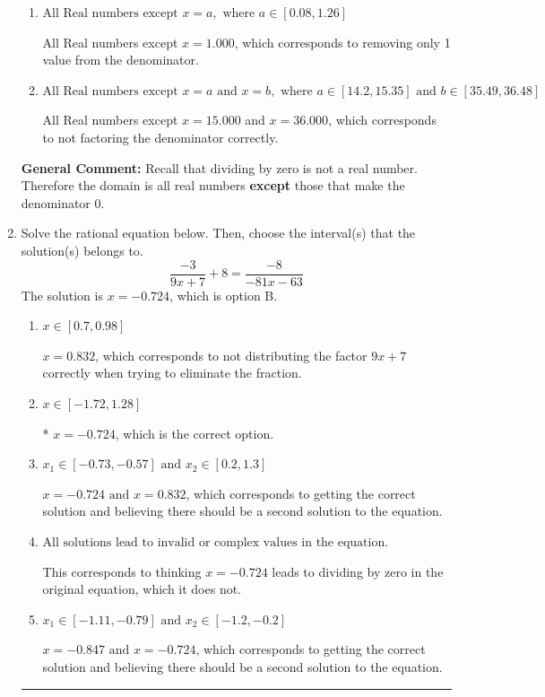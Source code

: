 \documentclass{extbook}[14pt]
\newcommand{\litem}[1]{\item #1

\rule{\textwidth}{0.4pt}}
\begin{document}
\begin{enumerate}
{\begin{enumerate}[label=\Alph*.]
All Real numbers except $x = 15.000$, which corresponds to removing a distractor value from the denominator.
\item \( \text{All Real numbers except } x = a, \text{ where } a \in [0.08, 1.26] \)

All Real numbers except $x = 1.000$, which corresponds to removing only 1 value from the denominator.
\item \( \text{All Real numbers except } x = a \text{ and } x = b, \text{ where } a \in [14.2, 15.35] \text{ and } b \in [35.49, 36.48] \)

All Real numbers except $x = 15.000$ and $x = 36.000$, which corresponds to not factoring the denominator correctly.
\end{enumerate}

\textbf{General Comment:} Recall that dividing by zero is not a real number. Therefore the domain is all real numbers \textbf{except} those that make the denominator 0.
}
\litem{
Solve the rational equation below. Then, choose the interval(s) that the solution(s) belongs to.
\[ \frac{-3}{9x + 7} + 8 = \frac{-8}{-81x -63} \]The solution is \( x = -0.724 \), which is option B.\begin{enumerate}[label=\Alph*.]
\item \( x \in [0.7,0.98] \)

$x = 0.832$, which corresponds to not distributing the factor $9x + 7$ correctly when trying to eliminate the fraction.
\item \( x \in [-1.72,1.28] \)

* $x = -0.724$, which is the correct option.
\item \( x_1 \in [-0.73, -0.57] \text{ and } x_2 \in [0.2,1.3] \)

$x = -0.724 \text{ and } x = 0.832$, which corresponds to getting the correct solution and believing there should be a second solution to the equation.
\item \( \text{All solutions lead to invalid or complex values in the equation.} \)

This corresponds to thinking $x = -0.724$ leads to dividing by zero in the original equation, which it does not.
\item \( x_1 \in [-1.11, -0.79] \text{ and } x_2 \in [-1.2,-0.2] \)

$x = -0.847 \text{ and } x = -0.724$, which corresponds to getting the correct solution and believing there should be a second solution to the equation.
\end{enumerate}

}
\end{enumerate}
\end{document}
